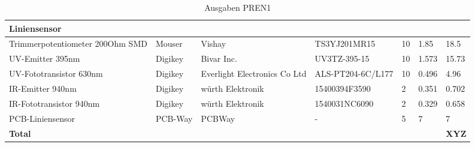 \documentclass[main.tex]{subfiles} %
\begin{document}
\begin{table}[h]
{\begin{tabular}{|p{3cm}|p{2.5cm}|p{2.5cm}|p{3cm}|p{1cm}|p{1.5cm}|p{1cm}|}
        \rowcolor{lightgray} Liniensensor      &                        &                               &                                 &                     &                            &                                 \\ \hline
        Trimmerpotentiometer 200Ohm SMD        & Mouser                 & Vishay                        & TS3YJ201MR15                    & 10                  & 1.85                       & 18.5                           \\ \hline
        UV-Emitter 395nm                       & Digikey                & Bivar Inc.                    & UV3TZ-395-15                    & 10                  & 1.573                      & 15.73                           \\ \hline
        UV-Fototransistor 630nm                & Digikey                & Everlight Electronics Co Ltd  & ALS-PT204-6C/L177               & 10                  & 0.496                      & 4.96                           \\ \hline
        IR-Emitter 940nm                       & Digikey                & würth Elektronik              & 15400394F3590                   & 2                   & 0.351                      & 0.702                           \\ \hline
        IR-Fototransistor 940nm                & Digikey                & würth Elektronik              & 1540031NC6090                   & 2                   & 0.329                      & 0.658                           \\ \hline
        PCB-Liniensensor                       & PCB-Way                & PCBWay                        & -                               & 5                   & 7                          & 7                           \\ \hline

        \textbf{Total}                         &                        &                               &                                 &                     &                            & \textbf{XYZ}                   \\ \hline
    \end{tabular}
    }
    \caption{Ausgaben PREN1}
    \label{tab:Ausgaben_PREN1}
\end{table}
\end{document}

